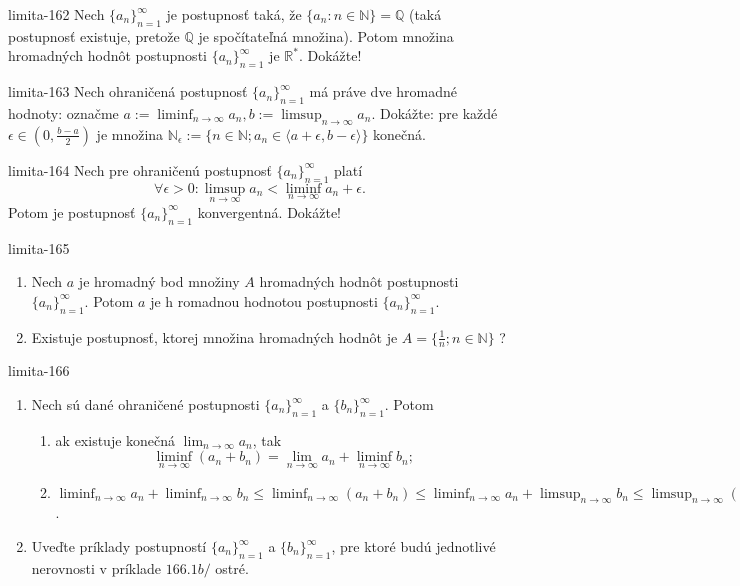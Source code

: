\begin{defproblem}{limita-162}
Nech ${\{a_n\}}_{n=1}^\infty$ je postupnosť taká, že $\{ a_n: n \in \mathbb{N} \}=\mathbb{Q}$ (taká postupnosť existuje, pretože $\mathbb{Q}$ je spočítateľná množina). Potom množina hromadných hodnôt postupnosti ${\{a_n\}}_{n=1}^\infty$ je $\mathbb{R^*}$. Dokážte!
\end{defproblem}

\begin{defproblem}{limita-163}
Nech ohraničená postupnosť ${\{a_n\}}_{n=1}^\infty$ má práve dve hromadné hodnoty: označme $a := \liminf_{n \rightarrow \infty} a_n,b := \limsup_{n \rightarrow \infty} a_n$. Dokážte: pre každé $\epsilon \in (0,\frac{b-a}{2})$ je množina $\mathbb{N_\epsilon} := \{n \in \mathbb{N}; a_n \in \langle a+\epsilon, b-\epsilon \rangle \}$ konečná.
\end{defproblem}

\begin{defproblem}{limita-164}
Nech pre ohraničenú postupnosť ${\{a_n\}}_{n=1}^\infty$ platí $$\forall \epsilon > 0: \limsup_{n \rightarrow \infty} a_n < \liminf_{n \rightarrow \infty} a_n+\epsilon.$$ Potom je postupnosť ${\{a_n\}}_{n=1}^\infty$ konvergentná. Dokážte!
\end{defproblem}

\begin{defproblem}{limita-165}
\begin{enumerate}
\item Nech $a$ je hromadný bod množiny $A$ hromadných hodnôt postupnosti ${\{a_n\}}_{n=1}^\infty$. Potom $a$ je h romadnou hodnotou postupnosti ${\{a_n\}}_{n=1}^\infty$.
\item Existuje postupnosť, ktorej množina hromadných hodnôt je $A=\{ \frac{1}{n}; n \in \mathbb{N} \}$ ?
\end{enumerate}
\end{defproblem}

\begin{defproblem}{limita-166}
\begin{enumerate}
\item Nech sú dané ohraničené postupnosti ${\{a_n\}}_{n=1}^\infty$ a ${\{b_n\}}_{n=1}^\infty$. Potom
\begin{enumerate}
\item ak existuje konečná $\lim_{n \rightarrow \infty} a_n$, tak
$$\liminf_{n \rightarrow \infty} (a_n+b_n)=\lim_{n \rightarrow \infty} a_n+\liminf_{n \rightarrow \infty} b_n;$$
\item $\liminf_{n \rightarrow \infty} a_n+\liminf_{n \rightarrow \infty} b_n \leq \liminf_{n \rightarrow \infty} (a_n+b_n)\leq \liminf_{n \rightarrow \infty} a_n+\limsup_{n \rightarrow \infty} b_n\leq \limsup_{n \rightarrow \infty} (a_n+b_n) \leq \limsup_{n \rightarrow \infty} a_n+\limsup_{n \rightarrow \infty} b_n$.
\end{enumerate}
\item Uveďte príklady postupností ${\{a_n\}}_{n=1}^\infty$ a ${\{b_n\}}_{n=1}^\infty$, pre ktoré budú jednotlivé nerovnosti v príklade $166.1b/$ ostré.
\end{enumerate}
\end{defproblem}

